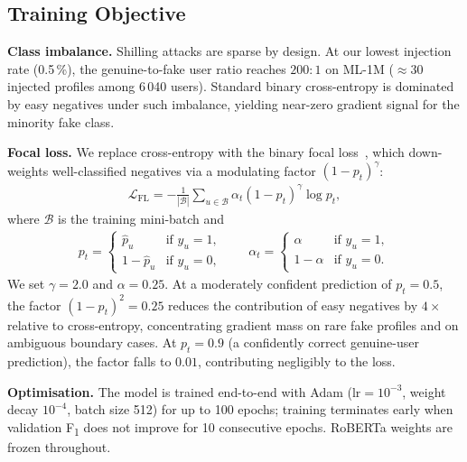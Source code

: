 \subsection{Training Objective}
\label{sec:objective}

\textbf{Class imbalance.}
Shilling attacks are sparse by design.
At our lowest injection rate (0.5\,\%), the genuine-to-fake user ratio reaches
$200\!:\!1$ on ML-1M (${\approx}30$ injected profiles among 6\,040 users).
Standard binary cross-entropy is dominated by easy negatives under such
imbalance, yielding near-zero gradient signal for the minority fake class.

\textbf{Focal loss.}
We replace cross-entropy with the binary focal
loss~\cite{lin2017focal}, which down-weights well-classified negatives via a
modulating factor $(1 - p_t)^\gamma$:
\begin{align}
  \mathcal{L}_{\mathrm{FL}}
  = -\frac{1}{|\mathcal{B}|}
    \sum_{u \in \mathcal{B}}
    \alpha_t \left(1 - p_t\right)^{\!\gamma} \log p_t,
  \label{eq:focal}
\end{align}
where $\mathcal{B}$ is the training mini-batch and
\begin{align}
  p_t
  = \begin{cases}
      \hat{p}_u      & \text{if } y_u = 1, \\
      1 - \hat{p}_u  & \text{if } y_u = 0,
    \end{cases}
  \qquad
  \alpha_t
  = \begin{cases}
      \alpha      & \text{if } y_u = 1, \\
      1 - \alpha  & \text{if } y_u = 0.
    \end{cases}
  \label{eq:pt_at}
\end{align}
We set $\gamma = 2.0$ and $\alpha = 0.25$.
At a moderately confident prediction of $p_t = 0.5$, the factor
$(1 - p_t)^2 = 0.25$ reduces the contribution of easy negatives by $4\times$
relative to cross-entropy, concentrating gradient mass on rare fake profiles
and on ambiguous boundary cases.
At $p_t = 0.9$ (a confidently correct genuine-user prediction), the factor
falls to $0.01$, contributing negligibly to the loss.

\textbf{Optimisation.}
The model is trained end-to-end with Adam
($\text{lr} = 10^{-3}$, weight decay $10^{-4}$, batch size 512) for up to
100 epochs; training terminates early when validation
F\textsubscript{1} does not improve for 10 consecutive epochs.
RoBERTa weights are frozen throughout.
